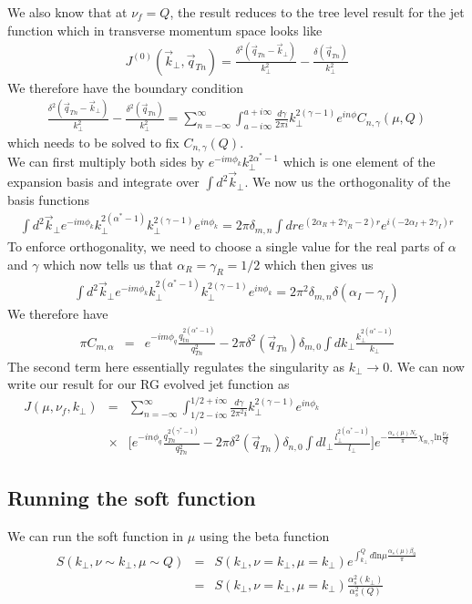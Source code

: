 \documentclass[letter,11pt]{article}
\newcommand{\nn}{\nonumber}
\newcommand{\bea}{\begin{eqnarray}}
\newcommand{\eea}{\end{eqnarray}}
\def\ln{\textrm{ln}}
\def\nn{\nonumber}
\begin{document}
We also know that at $\nu_f= Q$, the result reduces to the tree level result for the jet function which in transverse momentum space looks like 
\bea
J^{(0)}(\vec{k}_{\perp}, \vec{q}_{Tn}) = \frac{\delta^2(\vec{q}_{Tn}-\vec{k}_{\perp})}{k_{\perp}^2}-\frac{\delta(\vec{q}_{Tn})}{k_{\perp}^2} 
\eea
We therefore have the boundary condition 
\bea
 \frac{\delta^2(\vec{q}_{Tn}-\vec{k}_{\perp})}{k_{\perp}^2}-\frac{\delta^2(\vec{q}_{Tn})}{k_{\perp}^2} =\sum_{n=-\infty}^{\infty}\int_{a-i\infty}^{a+i\infty}\frac{d\gamma}{2\pi i} k_{\perp}^{2(\gamma-1)}e^{in\phi}  C_{n,\gamma}(\mu, Q)
\eea
which needs to be solved to fix $C_{n,\gamma}(Q)$. \\
We can first multiply both sides by $e^{-im\phi_k} k_{\perp}^{2\alpha^*-1}$ which is one element of the expansion basis and integrate over $\int d^2\vec{k}_{\perp}$.
We now us the orthogonality of the basis functions 
\bea
  \int d^2\vec{k}_{\perp}e^{-im\phi_k} k_{\perp}^{2(\alpha^*-1)}k_{\perp}^{2(\gamma-1)}e^{in\phi_k}= 2\pi \delta_{m,n}\int dr e^{(2\alpha_R+2\gamma_R-2)r}e^{i(-2\alpha_I+2\gamma_I)r}
\eea
To enforce orthogonality, we need to choose a single value for the real parts of $\alpha$ and $\gamma$ which now tells us that $\alpha_R=  \gamma_R =1/2$ which then gives us 
\bea
 \int d^2\vec{k}_{\perp}e^{-im\phi_k} k_{\perp}^{2(\alpha^*-1)}k_{\perp}^{2(\gamma-1)}e^{in\phi_k}=  2\pi^2 \delta_{m,n} \delta(\alpha_I-\gamma_I)
\eea
We therefore have 
\bea
\pi C_{m,\alpha}&=& e^{-im\phi_q}\frac{q_{tn}^{2(\alpha^*-1)}}{q_{Tn}^2}- 2\pi \delta^2(\vec{q}_{Tn})\delta_{m,0}\int dk_{\perp} \frac{k_{\perp}^{2(\alpha^*-1)}}{k_{\perp}}
\eea
The second term here essentially regulates the singularity as $k_{\perp} \rightarrow 0$. We can now write our result for our RG evolved jet function as 
\bea
J(\mu, \nu_f, k_{\perp}) &=&\sum_{n=-\infty}^{\infty}\int_{1/2-i\infty}^{1/2+i\infty}\frac{d\gamma}{2\pi^2 i} k_{\perp}^{2(\gamma-1)}e^{in\phi_k}\nn\\
&\times&\Bigg[e^{-in\phi_q}\frac{q_{Tn}^{2(\gamma^*-1)}}{q_{Tn}^2}- 2\pi\delta^2(\vec{q}_{Tn}) \delta_{n,0}\int dl_{\perp} \frac{l_{\perp}^{2(\alpha^*-1)}}{l_{\perp}}\Bigg] e^{ -\frac{\alpha_s(\mu) N_c}{\pi}\chi_{n,\gamma}\ln \frac{\nu_f}{Q}}
\label{JResum} 
\eea
\subsection{ Running the soft function} 
We can run the soft function in $\mu$ using the beta function 
\bea
S(k_{\perp},\nu \sim k_{\perp}, \mu \sim Q) &=& S(k_{\perp},\nu = k_{\perp}, \mu = k_{\perp}) e^{ \int_{k_{\perp}}^{Q} d \ln \mu \frac{\alpha_s(\mu)\beta_0}{\pi}} \nn\\
&=&  S(k_{\perp},\nu= k_{\perp}, \mu=k_{\perp})\frac{\alpha_s^2(k_{\perp})}{\alpha_s^2(Q)}
\label{SResum}
\eea
\end{document}
